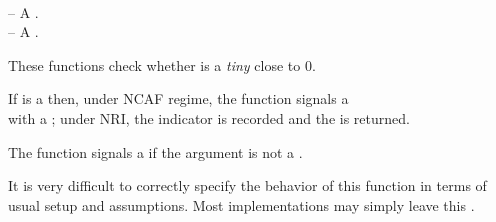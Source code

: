 \documentclass[../Comparisons-Predicates.tex]{subfiles}
\begin{document}
  
  
  \DSyntax{}
  
    \RArrow {}\\
    \RArrow {}
  
  \DArgsNValues{}
  
   -- A .\\
   -- A .
  
  
  \DDescription{}
  
  These functions check whether  is a \emph{tiny}
   close to  $0$.
  
  \DExceptional{}
  
  If  is a  then, under NCAF regime, the
  function signals a\\
   with a
   ; under NRI, the
   indicator is recorded and the   is returned.
  
  The function signals a  if the argument 
  is not a .
  
  \DNotes{}
  
  It is very difficult to correctly specify the behavior of this function
  in terms of \CL{} usual setup and assumptions.  Most implementations
  may simply leave this .
  
\end{document}
